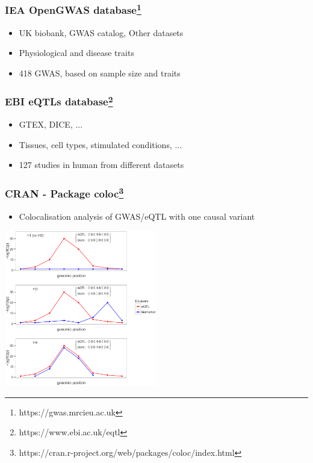 \documentclass{beamer}
\begin{document}
    \begin{frame}
        \frametitle{IEA OpenGWAS database\footnote{https://gwas.mrcieu.ac.uk}}

        \begin{itemize}
            \item UK biobank, GWAS catalog, Other datasets
            \item Physiological and disease traits
            \item 418 GWAS, based on sample size and traits
        \end{itemize}

    \end{frame}

    \begin{frame}
        \frametitle{EBI eQTLs database\footnote{https://www.ebi.ac.uk/eqtl}}

        \begin{itemize}
            \item GTEX, DICE, ...
            \item Tissues, cell types, stimulated conditions, ...
            \item 127 studies in human from different datasets
        \end{itemize}

    \end{frame}

    \begin{frame}
        \frametitle{CRAN - Package coloc\footnote{https://cran.r-project.org/web/packages/coloc/index.html}}

        \begin{itemize}
            \item Colocalisation analysis of GWAS/eQTL with one causal variant
        \end{itemize}

        \begin{center}
            \includegraphics[width=0.5\textwidth]{../presentation_230120_gold2022_paris/fig/pgen.1004383.g001.png}
        \end{center}

    \end{frame}
\end{document}
